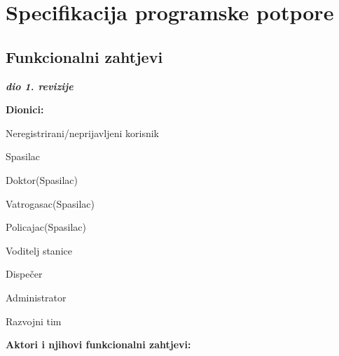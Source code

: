 \chapter{Specifikacija programske potpore}
		
	\section{Funkcionalni zahtjevi}

		\textbf{\textit{dio 1. revizije}}
		
		
		\noindent \textbf{Dionici:}
		
		\begin{packed_enum}
			
			\item Neregistrirani/neprijavljeni korisnik
			\item Spasilac
			\item Doktor(Spasilac)
			\item Vatrogasac(Spasilac)
			\item Policajac(Spasilac)
			\item Voditelj stanice		
			\item Dispečer
			\item Administrator
			\item Razvojni tim
	
			\end{packed_enum}
			
			\noindent \textbf{Aktori i njihovi funkcionalni zahtjevi:}
			
